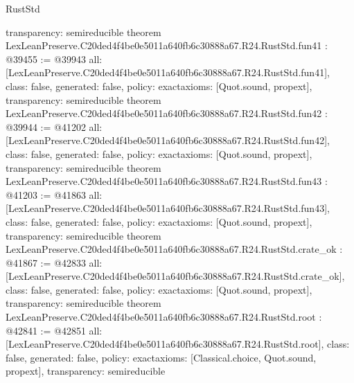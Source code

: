 \begin{lexlean}{RustStd}
\begin{coremodule}
{  transparency: semireducible
}
theorem LexLeanPreserve.C20ded4f4be0e5011a640fb6c30888a67.R24.RustStd.fun41 : @39455 := @39943 {
  all: [LexLeanPreserve.C20ded4f4be0e5011a640fb6c30888a67.R24.RustStd.fun41],
  class: false,
  generated: false,
  policy: exact{axioms: [Quot.sound, propext]},
  transparency: semireducible
}
theorem LexLeanPreserve.C20ded4f4be0e5011a640fb6c30888a67.R24.RustStd.fun42 : @39944 := @41202 {
  all: [LexLeanPreserve.C20ded4f4be0e5011a640fb6c30888a67.R24.RustStd.fun42],
  class: false,
  generated: false,
  policy: exact{axioms: [Quot.sound, propext]},
  transparency: semireducible
}
theorem LexLeanPreserve.C20ded4f4be0e5011a640fb6c30888a67.R24.RustStd.fun43 : @41203 := @41863 {
  all: [LexLeanPreserve.C20ded4f4be0e5011a640fb6c30888a67.R24.RustStd.fun43],
  class: false,
  generated: false,
  policy: exact{axioms: [Quot.sound, propext]},
  transparency: semireducible
}
theorem LexLeanPreserve.C20ded4f4be0e5011a640fb6c30888a67.R24.RustStd.crate_ok : @41867 := @42833 {
  all: [LexLeanPreserve.C20ded4f4be0e5011a640fb6c30888a67.R24.RustStd.crate_ok],
  class: false,
  generated: false,
  policy: exact{axioms: [Quot.sound, propext]},
  transparency: semireducible
}
theorem LexLeanPreserve.C20ded4f4be0e5011a640fb6c30888a67.R24.RustStd.root : @42841 := @42851 {
  all: [LexLeanPreserve.C20ded4f4be0e5011a640fb6c30888a67.R24.RustStd.root],
  class: false,
  generated: false,
  policy: exact{axioms: [Classical.choice, Quot.sound, propext]},
  transparency: semireducible
}


\end{coremodule}
\end{lexlean}

